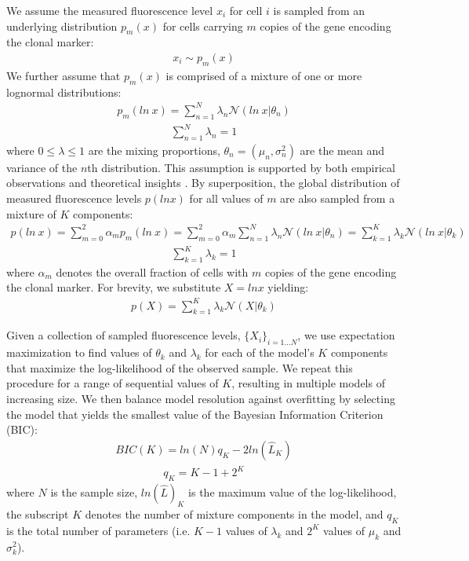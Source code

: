 \documentclass[10pt,letterpaper]{article}
\begin{document}
We assume the measured fluorescence level $x_i$ for cell $i$ is sampled from an underlying distribution $p_m(x)$ for cells carrying $m$ copies of the gene encoding the clonal marker:
\begin{eqnarray}
x_i \sim p_m(x)
\end{eqnarray}
We further assume that $p_m(x)$ is comprised of a mixture of one or more lognormal distributions:
\begin{eqnarray}
p_m(ln\ x) = \sum^{N}_{n=1}\lambda_n \mathcal{N}(ln\ x|\theta_{n})
\end{eqnarray}
\begin{eqnarray}
\sum^{N}_{n=1}\lambda_n=1
\end{eqnarray}
where $0 \leq \lambda \leq 1$ are the mixing proportions, $\theta_n=(\mu_n,\sigma_n^2)$ are the mean and variance of the $n$th distribution. This assumption is supported by both empirical observations and theoretical insights \cite{Furusawa2005,Beal2017}. By superposition, the global distribution of measured fluorescence levels $p(ln x)$ for all values of $m$ are also sampled from a mixture of $K$ components:
\begin{eqnarray}
p(ln\ x) =  \sum^{2}_{m=0} \alpha_m p_m(ln\ x) = \sum^{2}_{m=0} \alpha_m 
\sum^{N}_{n=1}\lambda_n \mathcal{N}(ln\ x|\theta_{n}) = \sum^{K}_{k=1}\lambda_k \mathcal{N}(ln\ x|\theta_{k})
\end{eqnarray}
\begin{eqnarray}
\sum^{K}_{k=1}\lambda_k=1
\end{eqnarray}
where $\alpha_m$ denotes the overall fraction of cells with $m$ copies of the gene encoding the clonal marker. For brevity, we substitute $X = ln x$ yielding:
\begin{eqnarray}
p(X) = \sum^{K}_{k=1}\lambda_k \mathcal{N}(X|\theta_{k})
\end{eqnarray}

Given a collection of sampled fluorescence levels, $\{X_i\}_{i=1 \ldots N}$, we use expectation maximization to find values of $\theta_k$ and $\lambda_k$ for each of the model's $K$ components that maximize the log-likelihood of the observed sample. We repeat this procedure for a range of sequential values of $K$, resulting in multiple models of increasing size. We then balance model resolution against overfitting by selecting the model that yields the smallest value of the Bayesian Information Criterion (BIC):
\begin{eqnarray}
BIC(K) = ln(N)q_K - 2 ln(\hat{L}_K)
\end{eqnarray}
\begin{eqnarray}
q_K = K-1 + 2^K
\end{eqnarray}
where $N$ is the sample size, $ln(\hat{L})_K$ is the maximum value of the log-likelihood, the subscript $K$ denotes the number of mixture components in the model, and $q_K$ is the total number of parameters (i.e. $K-1$ values of $\lambda_k$ and $2^K$ values of $\mu_k$ and $\sigma_k^2$).
\end{document}
